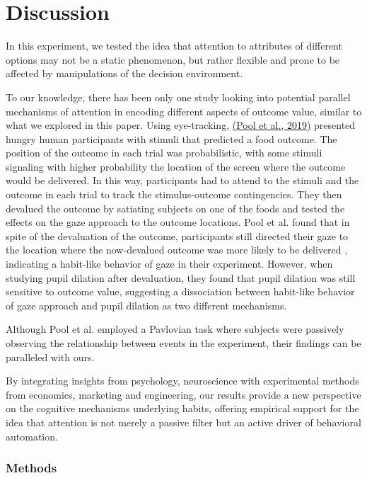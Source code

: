 \section{Discussion}\label{discussion}

In this experiment, we tested the idea that attention to attributes of different options may not be a static phenomenon, but rather flexible and prone to be affected by manipulations of the decision environment.

To our knowledge, there has been only one study looking into potential parallel mechanisms of attention in encoding different aspects of outcome value, similar to what we explored in this paper. Using eye-tracking, \href{https://www.zotero.org/google-docs/?jIZ3Fc}{(Pool et al., 2019)} presented hungry human participants with stimuli that predicted a food outcome. The position of the outcome in each trial was probabilistic, with some stimuli signaling with higher probability the location of the screen where the outcome would be delivered. In this way, participants had to attend to the stimuli and the outcome in each trial to track the stimulus-outcome contingencies. They then devalued the outcome by satiating subjects on one of the foods and tested the effects on the gaze approach to the outcome locations. Pool et al. found that in spite of the devaluation of the outcome, participants still directed their gaze to the location where the now-devalued outcome was more likely to be delivered , indicating a habit-like behavior of gaze in their experiment. However, when studying pupil dilation after devaluation, they found that pupil dilation was still sensitive to outcome value, suggesting a dissociation between habit-like behavior of gaze approach and pupil dilation as two different mechanisms.

Although Pool et al. employed a Pavlovian task where subjects were passively observing the relationship between events in the experiment, their findings can be paralleled with ours.

By integrating insights from psychology, neuroscience with experimental methods from economics, marketing and engineering, our results provide a new perspective on the cognitive mechanisms underlying habits, offering empirical support for the idea that attention is not merely a passive filter but an active driver of behavioral automation.

\subsubsection{Methods}\label{methods}

